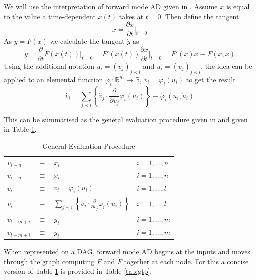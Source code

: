 \documentclass{article}
\begin{document}
We will use the interpretation of forward mode AD given in \cite{dhamarticle}. Assume $x$ is equal to the value a time-dependent $x(t)$ takes at $t=0$. Then define the tangent 
\begin{equation*}
    \dot{x} = \frac{\partial x}{\partial t} \Big|_{t=0}
\end{equation*}
As $y = F(x)$ we calculate the tangent $\dot{y}$ as
\begin{equation*}
    \Dot{y} = \frac{\partial}{\partial t} F(x (t)) \Big|_{t=0} 
    = F'(x (t)) \frac{\partial x}{\partial t} \Big|_{t=0}
    = F'(x) \Dot{x}
    \equiv \Dot{F}(x, \Dot{x})
\end{equation*}
Using the additional notation $u_i = (v_j)_{j \prec i}$ and $\Dot{u}_i = (\Dot{v}_j)_{j \prec i}$, the idea can be applied to an elemental function $\varphi_i : \mathbb{R}^{n_i} \longrightarrow \mathbb{R}$, $v_i = \varphi_i (u_i)$ to get the result
\begin{equation}
    \label{tangentequ}
    \Dot{v_i} = \sum_{j \prec i} \left\{ \Dot{v}_j \cdot \frac{\partial}{\partial v_j} \varphi_i (u_i) \right\} 
    \equiv \Dot{\varphi}_i(u_i, \Dot{u}_i)
\end{equation}

This can be summarised as the general evaluation procedure given in \cite{evald} and given in Table \ref{tab:gep}.

\begin{table}[h]
    \centering
    \begin{tabular}{|lcll|}
        \hline
        $v_{i-n}$ & $\equiv$ & $x_i$ & $i = 1, \ldots, n$ \\
        $\Dot{v}_{i-n}$ & $\equiv$ & $\Dot{x}_i$ & $i = 1, \ldots, n$ \\
        \hline
        $v_{i}$ & $\equiv$ & $v_i = \varphi_i (u_i)$ & $i = 1, \ldots, l$ \\
        $\Dot{v}_{i}$ & $\equiv$ & $\sum_{j \prec i} \left\{ \Dot{v}_j \cdot \frac{\partial}{\partial v_j} \varphi_i (u_i) \right\}$ & $i = 1, \ldots, l$ \\
        \hline
        $v_{l-m+i}$ & $\equiv$ & $y_i$ & $i = 1, \ldots, m$ \\
        $\Dot{v}_{l-m+i}$ & $\equiv$ & $\Dot{y}_i$ & $i = 1, \ldots, m$ \\
        \hline
    \end{tabular}
    \caption{General Evaluation Procedure}
    \label{tab:gep}
\end{table}

When represented on a DAG, forward mode AD begins at the inputs and moves through the graph computing $F$ and $\Dot{F}$ together at each node. For this a concise version of Table \ref{tab:gep} is provided in Table \ref{tab:gtp}.
\end{document}
